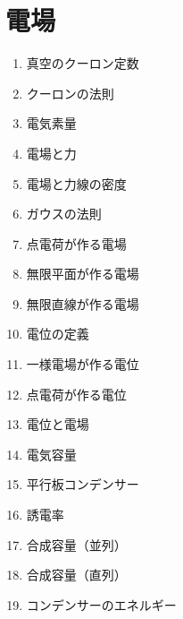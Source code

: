 \documentclass[10pt]{jarticle}
\begin{document}
\addtocounter{page}{-1}
\thispagestyle{empty}
\tableofcontents



\newpage
\addtocounter{page}{-1}
\thispagestyle{empty}
\section{電場}

\begin{enumerate}
\small
\itemsep-4mm
\item 真空のクーロン定数 \\
\item クーロンの法則 \\
\item 電気素量 \\
\item 電場と力 \\
\item 電場と力線の密度 \\
\item ガウスの法則 \\
\item 点電荷が作る電場 \\
\item 無限平面が作る電場 \\
\item 無限直線が作る電場 \\
\end{enumerate}


\newpage
\addtocounter{page}{-1}
\thispagestyle{empty}

\vspace*{-10mm}
\begin{enumerate}
\setcounter{enumi}{9}
\small
\itemsep-4mm
\item 電位の定義 \\
\item 一様電場が作る電位 \\
\item 点電荷が作る電位 \\
\item 電位と電場 \\
\item 電気容量 \\
\item 平行板コンデンサー \\
\item 誘電率 \\
\item 合成容量（並列） \\
\item 合成容量（直列） \\
\item コンデンサーのエネルギー \\
\end{enumerate}
\end{document}
